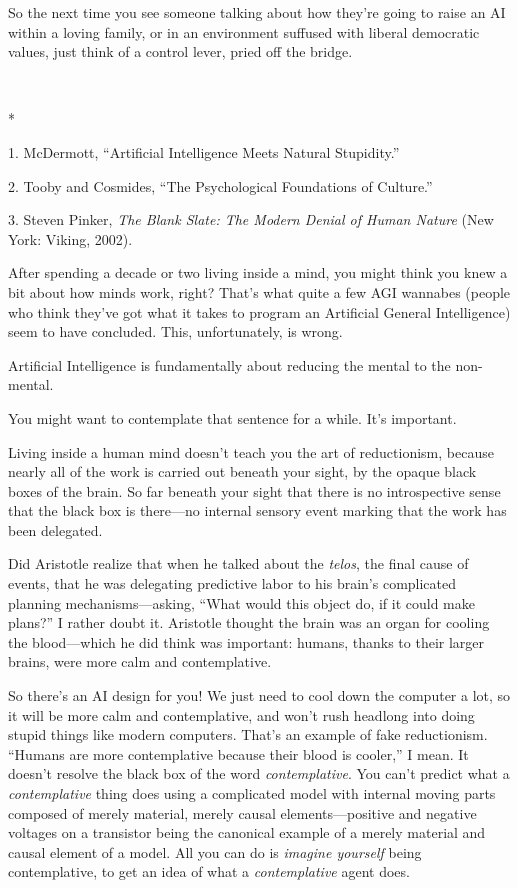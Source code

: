 {
 So the next time you see someone talking about how
they're going to raise an AI within a loving family, or
in an environment suffused with liberal democratic values, just think
of a control lever, pried off the bridge.}

{\centering
 \ ~
\par}

{\centering
 *
\par}


\bigskip

{
 1. McDermott, ``Artificial Intelligence Meets
Natural Stupidity.''}

{
 2. Tooby and Cosmides, ``The Psychological
Foundations of Culture.''}

{
 3. Steven Pinker, \textit{The Blank Slate: The Modern Denial of
Human Nature} (New York: Viking, 2002).}


{
 After spending a decade or two living inside a mind, you might
think you knew a bit about how minds work, right?
That's what quite a few AGI wannabes (people who think
they've got what it takes to program an Artificial
General Intelligence) seem to have concluded. This, unfortunately, is
wrong. }

{
 Artificial Intelligence is fundamentally about reducing the mental
to the non-mental.}

{
 You might want to contemplate that sentence for a while.
It's important.}

{
 Living inside a human mind doesn't teach you the
art of reductionism, because nearly all of the work is carried out
beneath your sight, by the opaque black boxes of the brain. So far
beneath your sight that there is no introspective sense that the black
box is there---no internal sensory event marking that the work has been
delegated.}

{
 Did Aristotle realize that when he talked about the
\textit{telos}, the final cause of events, that he was delegating
predictive labor to his brain's complicated planning
mechanisms---asking, ``What would this object do, if
it could make plans?'' I rather doubt it. Aristotle
thought the brain was an organ for cooling the blood---which he did
think was important: humans, thanks to their larger brains, were more
calm and contemplative.}

{
 So there's an AI design for you! We just need to
cool down the computer a lot, so it will be more calm and
contemplative, and won't rush headlong into doing
stupid things like modern computers. That's an example
of fake reductionism. ``Humans are more contemplative
because their blood is cooler,'' I mean. It
doesn't resolve the black box of the word
\textit{contemplative}. You can't predict what a
\textit{contemplative} thing does using a complicated model with
internal moving parts composed of merely material, merely causal
elements---positive and negative voltages on a transistor being the
canonical example of a merely material and causal element of a model.
All you can do is \textit{imagine yourself} being contemplative, to get
an idea of what a \textit{contemplative} agent does.}

